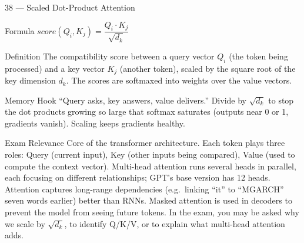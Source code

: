 \documentclass[aspectratio=169,8pt]{beamer}
\begin{document}
	\begin{frame}{38 --- Scaled Dot-Product Attention}
		\begin{block}{Formula}
			$score(Q_i, K_j) = \dfrac{Q_i \cdot K_j}{\sqrt{d_k}}$
		\end{block}
		\begin{block}{Definition}
			The compatibility score between a query vector $Q_i$ (the token being processed) and a key vector $K_j$ (another token), scaled by the square root of the key dimension $d_k$. The scores are softmaxed into weights over the value vectors.
		\end{block}
		\begin{block}{Memory Hook}
			``Query asks, key answers, value delivers.'' Divide by $\sqrt{d_k}$ to stop the dot products growing so large that softmax saturates (outputs near 0 or 1, gradients vanish). Scaling keeps gradients healthy.
		\end{block}
		\begin{block}{Exam Relevance}
			Core of the transformer architecture. Each token plays three roles: Query (current input), Key (other inputs being compared), Value (used to compute the context vector). Multi-head attention runs several heads in parallel, each focusing on different relationships; GPT's base version has 12 heads. Attention captures long-range dependencies (e.g.\ linking ``it'' to ``MGARCH'' seven words earlier) better than RNNs. Masked attention is used in decoders to prevent the model from seeing future tokens. In the exam, you may be asked why we scale by $\sqrt{d_k}$, to identify Q/K/V, or to explain what multi-head attention adds.
		\end{block}
	\end{frame}
	
\end{document}
